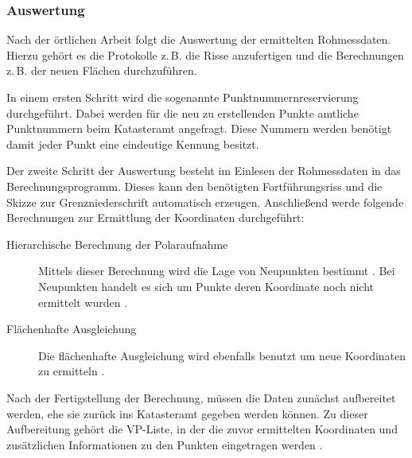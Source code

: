 
\subsubsection{Auswertung} \label{subsubsec:auswertung}

Nach der örtlichen Arbeit folgt die Auswertung der ermittelten Rohmessdaten. Hierzu gehört es die Protokolle z.\,B. die Risse anzufertigen und die Berechnungen z.\,B. der neuen Flächen durchzuführen. 

In einem ersten Schritt wird die sogenannte Punktnummernreservierung durchgeführt. Dabei werden für die neu zu erstellenden Punkte amtliche Punktnummern beim Katasteramt angefragt. Diese Nummern werden benötigt damit jeder Punkt eine eindeutige Kennung besitzt.

Der zweite Schritt der Auswertung besteht im Einlesen der Rohmessdaten in das Berechnungsprogramm. Dieses kann den benötigten Fortführungsriss und die Skizze zur Grenzniederschrift automatisch erzeugen.
Anschließend werde folgende Berechnungen zur Ermittlung der Koordinaten durchgeführt:
\begin{description}
	\item[Hierarchische Berechnung der Polaraufnahme] Mittels dieser Berechnung wird die Lage von Neupunkten bestimmt \autocite[vgl.][]{wiki-polaraufnahme}. Bei Neupunkten handelt es sich um Punkte deren Koordinate noch nicht ermittelt wurden \autocite[vgl.][]{wiki-neupunkt}.  
	\item[Flächenhafte Ausgleichung] Die flächenhafte Ausgleichung wird ebenfalls benutzt um neue Koordinaten zu ermitteln  \autocite[vgl.][6]{bezk-ausgleichung}.
\end{description}

Nach der Fertigstellung der Berechnung, müssen die Daten zunächst aufbereitet werden, ehe sie zurück ins Katasteramt gegeben werden können.
Zu dieser Aufbereitung gehört die \ac{VP-Liste}, in der die zuvor ermittelten Koordinaten und zusätzlichen Informationen zu den Punkten eingetragen werden \autocite[vgl.][62]{bezk-vp-liste}.

